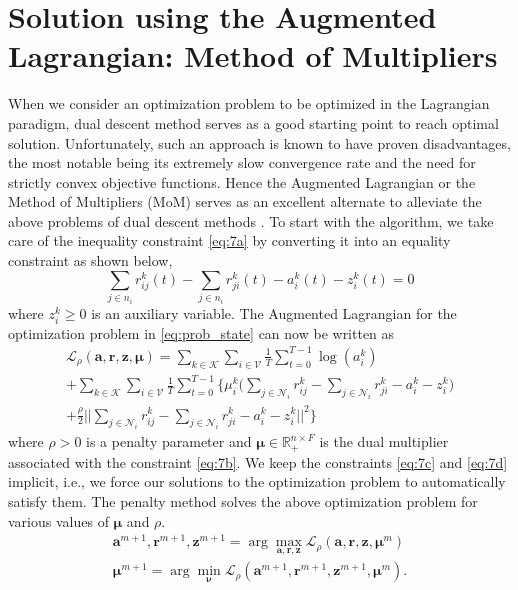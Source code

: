 \documentclass[lettersize,journal]{IEEEtran}
\begin{document}
\section{Solution using the Augmented Lagrangian: Method of Multipliers} \label{sec:mom}
When we consider an optimization problem to be optimized in the Lagrangian paradigm, dual descent method serves as a good starting point to reach optimal solution. Unfortunately, such an approach is known to have proven disadvantages, the most notable being its extremely slow convergence rate and the need for strictly convex objective functions. Hence the Augmented Lagrangian or the Method of Multipliers (MoM) serves as an excellent alternate to alleviate the above problems of dual descent methods \cite{chatzipanagiotis2015augmented, bertsekas2015parallel, ruszczynski2011nonlinear}. To start with the algorithm, we take care of the inequality constraint \eqref{eq:7a} by converting it into an equality constraint as shown below,
\begin{equation} \label{eq:ineq_to_equal}
    \sum_{j \in n_i} r_{ij}^k(t) - \sum_{j \in n_i} r_{ji}^k(t) - a_i^k(t) - z_i^k(t) = 0
\end{equation}
where $z_i^k \geq 0$ is an auxiliary variable. %
The Augmented Lagrangian for the optimization problem in \eqref{eq:prob_state} can now be written as
\begin{multline} \label{aug_lag_mom}
     \mathcal{L}_{\rho} (\bm{a, r, z, \mu}) = \sum_{k\in\mathcal{K}} \sum_{i\in\mathcal{V}} \frac{1}{T} \sum_{t=0}^{T-1} \log ( a_i^k ) \\
    + \sum_{k\in\mathcal{K}}\sum_{i\in\mathcal{V}} \frac{1}{T} \sum_{t=0}^{T-1} \Bigg\{ \mu_i^k \Bigg( \sum_{j \in \mathcal{N}_i} r_{ij}^k - \sum_{j \in \mathcal{N}_i} r_{ji}^k - a_i^k - z_i^k \Bigg) \\
    + \frac{\rho}{2} \Biggl|\!\Biggl| \sum_{j \in \mathcal{N}_i} r_{ij}^k - \sum_{j \in \mathcal{N}_i} r_{ji}^k - a_i^k - z_i^k \Biggr|\!\Biggr|^2 \Bigg\}
\end{multline}
where $\rho > 0$ is a penalty parameter and $\bm{\mu} \in \mathbb{R}_+^{n \times F}$ is the dual multiplier associated with the constraint \eqref{eq:7b}. We keep the constraints \eqref{eq:7c} and \eqref{eq:7d} implicit, i.e., we force our solutions to the optimization problem to automatically satisfy them. The penalty method solves the above optimization problem for various values of $\bm{\mu}$ and $\rho$.
\begin{subequations} \label{eq:MoM_algo}
\begin{align}
    \bm{a}^{m+1}, \bm{r}^{m+1}, \bm{z}^{m+1} = \arg \max_{\bm{a}, \bm{r}, \bm{z}} \mathcal{L}_{\rho} (\bm{a}, \bm{r}, \bm{z}, \bm{\mu}^m) \\
    \bm{\mu}^{m+1} = \arg \min_{\bm{\nu}} \mathcal{L}_{\rho} (\bm{a}^{m+1}, \bm{r}^{m+1}, \bm{z}^{m+1}, \bm{\mu}^m).\label{eq:mom_min_dual}
    \end{align}
\end{subequations}
\end{document}
